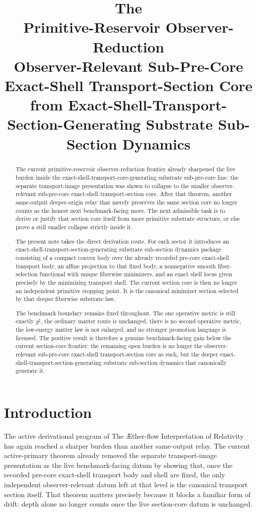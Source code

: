 \documentclass[11pt]{article}
\title{\textbf{The \TheoryName{}}\\[0.4em]
\large Primitive-Reservoir Observer-Reduction\\
\large Observer-Relevant Sub-Pre-Core Exact-Shell Transport-Section Core\\
\large from Exact-Shell-Transport-Section-Generating Substrate Sub-Section Dynamics}
\author{}
\date{}
\newcommand{\Aflow}{\AE{}ther-flow}
\newcommand{\TheoryName}{\Aflow{} Interpretation of Relativity}
\newcommand{\CompletedMetric}{g^{\sharp}}
\begin{document}
\maketitle

\begin{abstract}
The current primitive-reservoir observer-reduction frontier already sharpened the live burden inside the exact-shell-transport-core-generating substrate sub-pre-core line: the separate transport-image presentation was shown to collapse to the smaller observer-relevant sub-pre-core exact-shell transport-section core. After that theorem, another same-output deeper-origin relay that merely preserves the same section core no longer counts as the honest next benchmark-facing move. The next admissible task is to derive or justify that section core itself from more primitive substrate structure, or else prove a still smaller collapse strictly inside it.

The present note takes the direct derivation route. For each sector it introduces an exact-shell-transport-section-generating substrate sub-section dynamics package consisting of a compact convex body over the already recorded pre-core exact-shell transport body, an affine projection to that fixed body, a nonnegative smooth fiber-selection functional with unique fiberwise minimizers, and an exact shell locus given precisely by the minimizing transport shell. The current section core is then no longer an independent primitive stopping point. It is the canonical minimizer section selected by that deeper fiberwise substrate law.

The benchmark boundary remains fixed throughout. The one operative metric is still exactly \(\CompletedMetric\), the ordinary matter route is unchanged, there is no second operative metric, the low-energy matter law is not enlarged, and no stronger promotion language is licensed. The positive result is therefore a genuine benchmark-facing gain below the current section-core frontier: the remaining open burden is no longer the observer-relevant sub-pre-core exact-shell transport-section core as such, but the deeper exact-shell-transport-section-generating substrate sub-section dynamics that canonically generate it.
\end{abstract}

\section{Introduction}

The active derivational program of The \TheoryName{} has again reached a sharper burden than another same-output relay. The current active-primary theorem already removed the separate transport-image presentation as the live benchmark-facing datum by showing that, once the recorded pre-core exact-shell transport body and shell are fixed, the only independent observer-relevant datum left at that level is the canonical transport section itself. That theorem matters precisely because it blocks a familiar form of drift: depth alone no longer counts once the live section-core datum is unchanged.
\end{document}
